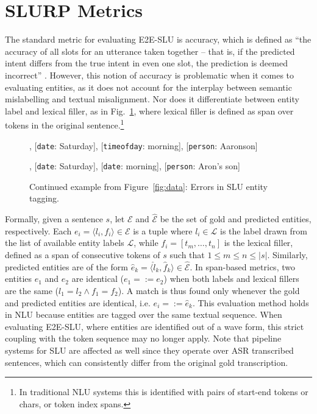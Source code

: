 \documentclass[11pt,a4paper]{article}
\newcommand{\datasetacr}{SLURP}
\newcommand{\etoe}{E2E}
\newcommand{\slu}{SLU}
\newcommand{\asr}{ASR}
\newcommand{\nlu}{NLU}
\begin{document}
\section{\datasetacr{} Metrics}
\label{sec:measure}


The standard metric for evaluating \etoe-\slu{} is accuracy, 
which is defined as ``the accuracy of all slots for an utterance taken together -- that is, if the predicted intent differs from the true intent in even one slot, the prediction is deemed incorrect'' \cite{lugosh19:Interspeech}. 
However, this notion of accuracy is problematic when it comes to evaluating entities, as it does not account for the interplay between semantic mislabelling and textual misalignment. Nor does it differentiate between entity label and lexical filler, as  in Fig.\ \ref{fig:slu_exp}, where lexical filler is defined as span over tokens in the original sentence.\footnote{In traditional \nlu{} systems this is identified with pairs of start-end tokens or chars, or token index spans.}

\begin{figure}
\begin{tcolorbox}
\footnotesize
\begin{description}[noitemsep]
\item[Gold:] [{\tt event\_name}: brunch], [{\tt date}: Saturday], [{\tt timeofday}: morning], [{\tt person}: Aaronson]
\item[SLU:] [{\tt event\_name}: brunch], [{\tt date}: Saturday], [{\tt date}: morning], [{\tt person}: Aron's son]
\end{description}
\end{tcolorbox}
\caption{Continued example from Figure~\ref{fig:data}: Errors in \slu{} entity tagging.}
    \label{fig:slu_exp}
\end{figure}
Formally, given a sentence $s$, let $\mathcal{E}$ and $\mathcal{\hat{E}}$ be the set of gold and predicted entities, respectively. Each $e_i = \langle l_i, f_i\rangle \in \mathcal{E}$ is a tuple where $l_i \in \mathcal{L}$ is the label drawn from the list of available entity labels $\mathcal{L}$, while $f_i = [t_m, \ldots, t_n]$ is the lexical filler, defined as a span of consecutive tokens of $s$ such that $1 \leq m \leq n \leq |s|$. Similarly, predicted entities are of the form $\hat{e}_k = \langle \hat{l}_k, \hat{f}_k\rangle \in \mathcal{\hat{E}}$.
In span-based metrics, two entities $e_1$ and $e_2$ are identical ($e_1 =:= e_2$) when both labels and lexical fillers are the same ($l_1 = l_2 \land f_1 = f_2$). A match is thus found only whenever the gold and predicted entities are identical, i.e. $e_i =:= \hat{e}_k$. This evaluation method holds in \nlu{} because entities are tagged over the same textual sequence. When evaluating \etoe-\slu, where entities are identified out of a wave form, this strict coupling with the token sequence may no longer apply. 
Note that pipeline systems for \slu{} are affected as well since they operate over \asr{} transcribed sentences, which can consistently differ from the original gold transcription. 
\end{document}
